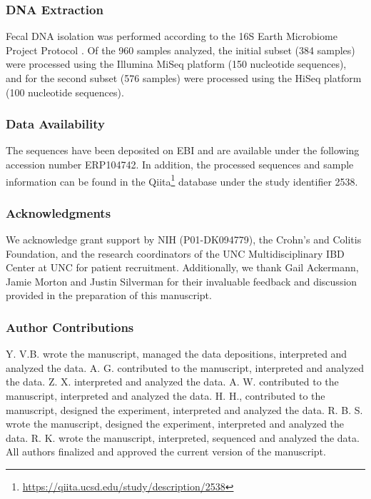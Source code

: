 \subsubsection{DNA Extraction}

Fecal DNA isolation was performed according to the 16S Earth Microbiome Project Protocol \cite{RN164}. Of the 960 samples analyzed, the initial subset (384 samples)  were processed using the Illumina MiSeq platform (150 nucleotide sequences), and for the second subset (576 samples) were processed using the HiSeq platform (100 nucleotide sequences).

\subsubsection{Data Availability}

The sequences have been deposited on EBI and are available under the following
accession number ERP104742.  In addition, the processed sequences and sample
information can be found in the
Qiita\footnote{\url{https://qiita.ucsd.edu/study/description/2538}} database
under the study identifier 2538.


\subsubsection{Acknowledgments}
We acknowledge grant support by NIH (P01-DK094779), the Crohn's and Colitis Foundation, and the research coordinators of the UNC Multidisciplinary IBD Center at UNC for patient recruitment. Additionally, we thank Gail Ackermann, Jamie Morton and Justin Silverman for their invaluable feedback and discussion provided in the preparation of this manuscript.

\subsubsection{Author Contributions}

Y. V.B. wrote the manuscript, managed the data depositions, interpreted and 
analyzed the data. A. G. contributed to the manuscript, interpreted and 
analyzed the data. Z. X. interpreted and analyzed the data. A. W. contributed 
to the manuscript, interpreted and analyzed the data. H. H., contributed to the 
manuscript, designed the experiment, interpreted and analyzed the data. R. B. 
S. wrote the manuscript, designed the experiment, interpreted and analyzed the 
data. R. K. wrote the manuscript, interpreted, sequenced and analyzed the data. 
All authors finalized and approved the current version of the manuscript.
